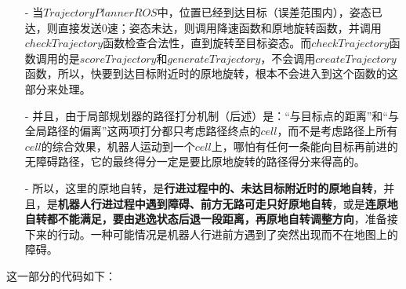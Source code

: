 \documentclass[9pt, oneside]{book}
\begin{document}
\begin{itemize}
    \item [-] 当$TrajectoryPlannerROS$中，位置已经到达目标（误差范围内），姿态已达，则直接发送0速；姿态未达，则调用降速函数和原地旋转函数，并调用$checkTrajectory$函数检查合法性，直到旋转至目标姿态。而$checkTrajectory$函数调用的是$scoreTrajectory$和$generateTrajectory$，不会调用$createTrajectory$函数，所以，快要到达目标附近时的原地旋转，根本不会进入到这个函数的这部分来处理。
    \item [-] 并且，由于局部规划器的路径打分机制（后述）是：“与目标点的距离”和“与全局路径的偏离”这两项打分都只考虑路径终点的$cell$，而不是考虑路径上所有$cell$的综合效果，机器人运动到一个$cell$上，哪怕有任何一条能向目标再前进的无障碍路径，它的最终得分一定是要比原地旋转的路径得分来得高的。
    \item [-] 所以，这里的原地自转，是\textbf{行进过程中的、未达目标附近时的原地自转}，并且，是\textbf{机器人行进过程中遇到障碍、前方无路可走只好原地自转}，或是\textbf{连原地自转都不能满足，要由逃逸状态后退一段距离，再原地自转调整方向}，准备接下来的行动。一种可能情况是机器人行进前方遇到了突然出现而不在地图上的障碍。
\end{itemize}

这一部分的代码如下：
\end{document}
